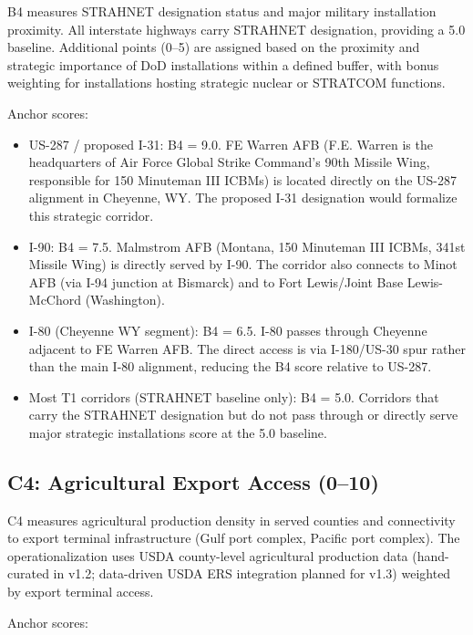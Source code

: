 B4 measures STRAHNET designation status and major military installation proximity. All interstate highways carry STRAHNET designation, providing a 5.0 baseline. Additional points (0--5) are assigned based on the proximity and strategic importance of DoD installations within a defined buffer, with bonus weighting for installations hosting strategic nuclear or STRATCOM functions.

Anchor scores:

\begin{itemize}
  \item US-287 / proposed I-31: B4 = 9.0. FE Warren AFB (F.E. Warren is the headquarters of Air Force Global Strike Command's 90th Missile Wing, responsible for 150 Minuteman III ICBMs) is located directly on the US-287 alignment in Cheyenne, WY. The proposed I-31 designation would formalize this strategic corridor.
  \item I-90: B4 = 7.5. Malmstrom AFB (Montana, 150 Minuteman III ICBMs, 341st Missile Wing) is directly served by I-90. The corridor also connects to Minot AFB (via I-94 junction at Bismarck) and to Fort Lewis/Joint Base Lewis-McChord (Washington).
  \item I-80 (Cheyenne WY segment): B4 = 6.5. I-80 passes through Cheyenne adjacent to FE Warren AFB. The direct access is via I-180/US-30 spur rather than the main I-80 alignment, reducing the B4 score relative to US-287.
  \item Most T1 corridors (STRAHNET baseline only): B4 = 5.0. Corridors that carry the STRAHNET designation but do not pass through or directly serve major strategic installations score at the 5.0 baseline.
\end{itemize}

\subsection{C4: Agricultural Export Access (0--10)}

C4 measures agricultural production density in served counties and connectivity to export terminal infrastructure (Gulf port complex, Pacific port complex). The operationalization uses USDA county-level agricultural production data (hand-curated in v1.2; data-driven USDA ERS integration planned for v1.3) weighted by export terminal access.

Anchor scores:

